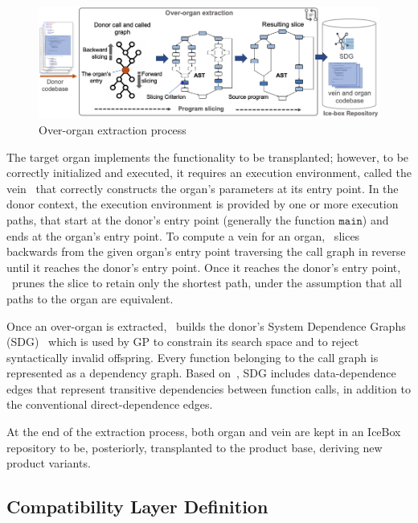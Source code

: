 \begin{figure}[t]
	\centering \includegraphics[width=\columnwidth]{images/over-organ_extraction2.png}
	\centering 
	\caption{Over-organ extraction process}
	\label{fig:over-organ_extraction}
\end{figure} 

The target organ implements the functionality to be transplanted; however, to be correctly initialized and executed, it requires an execution environment, called the vein~\cite{Barr2015} that correctly constructs the organ's parameters at its entry point. In the donor context, the execution environment is provided by one or more execution paths, that start at the donor's entry point (generally the function $\texttt{main}$) and ends at the organ's entry point. To compute a vein for an organ, \autoscalpel~slices backwards from the given organ's entry point traversing the call graph in reverse until it reaches the donor's entry point. Once it reaches the donor's entry point, \autoscalpel~prunes the slice to retain only the shortest path, under the assumption that all paths to the organ are equivalent. 

Once an over-organ is extracted, \autoscalpel~builds the donor's System Dependence Graphs (SDG)~\cite{Horwitz1988} which is used by GP to constrain its search space and to reject syntactically invalid offspring. Every function belonging to the call graph is represented as a dependency graph. Based on~\cite{Horwitz1988}, SDG includes data-dependence edges that represent transitive dependencies between function calls, in addition to the conventional direct-dependence edges. 

At the end of the extraction process, both organ and vein are kept in an IceBox repository to be, posteriorly, transplanted to the product base, deriving new product variants. 

\subsection{Compatibility Layer Definition}

